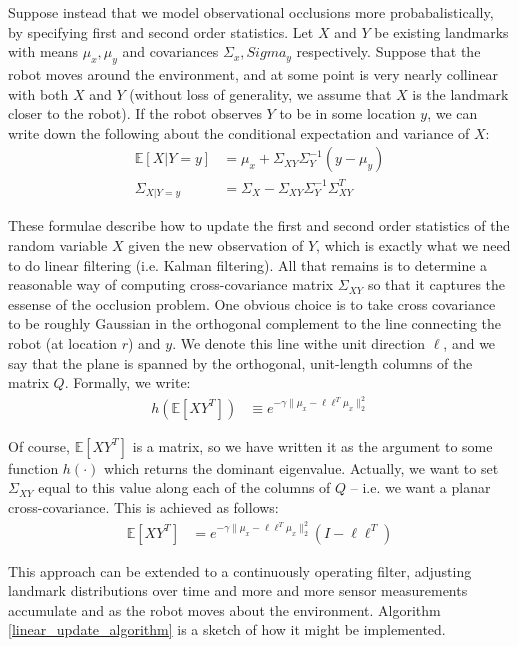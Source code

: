 \documentclass[12pt]{article}
\begin{document}
Suppose instead that we model observational occlusions more probabalistically, by specifying first and second order statistics. Let $X$ and $Y$ be existing landmarks with means $\mu_x, \mu_y$ and covariances $\Sigma_x, Sigma_y$ respectively. Suppose that the robot moves around the environment, and at some point is very nearly collinear with both $X$ and $Y$ (without loss of generality, we assume that $X$ is the landmark closer to the robot). If the robot observes $Y$ to be in some location $y$, we can write down the following about the conditional expectation and variance of $X$:
\begin{align}
  \mathbb{E}[X | Y = y] &= \mu_x + \Sigma_{XY} \Sigma_Y^{-1} (y - \mu_y) \\
  \Sigma_{X | Y = y} &= \Sigma_X - \Sigma_{XY} \Sigma_Y^{-1} \Sigma_{XY}^T
\end{align}

These formulae describe how to update the first and second order statistics of the random variable $X$ given the new observation of $Y$, which is exactly what we need to do linear filtering (i.e. Kalman filtering). All that remains is to determine a reasonable way of computing cross-covariance matrix $\Sigma_{XY}$ so that it captures the essense of the occlusion problem. One obvious choice is to take cross covariance to be roughly Gaussian in the orthogonal complement to the line connecting the robot (at location $r$) and $y$. We denote this line withe unit direction $\ell$, and we say that the plane is spanned by the orthogonal, unit-length columns of the matrix $Q$. Formally, we write:
\begin{align}
  h(\mathbb{E}[X Y^T]) &\equiv e^{-\gamma \|\mu_x - \ell \ell^T \mu_x\|_2^2}
\end{align}

Of course, $\mathbb{E}[X Y^T]$ is a matrix, so we have written it as the argument to some function $h(\cdot)$ which returns the dominant eigenvalue. Actually, we want to set $\Sigma_{XY}$ equal to this value along each of the columns of $Q$ -- i.e. we want a planar cross-covariance. This is achieved as follows:
\begin{align}
  \mathbb{E}[X Y^T] &= e^{-\gamma \|\mu_x - \ell \ell^T \mu_x\|_2^2} (I - \ell \ell^T)
\end{align}

This approach can be extended to a continuously operating filter, adjusting landmark distributions over time and more and more sensor measurements accumulate and as the robot moves about the environment. Algorithm \ref{linear_update_algorithm} is a sketch of how it might be implemented.
\end{document}
